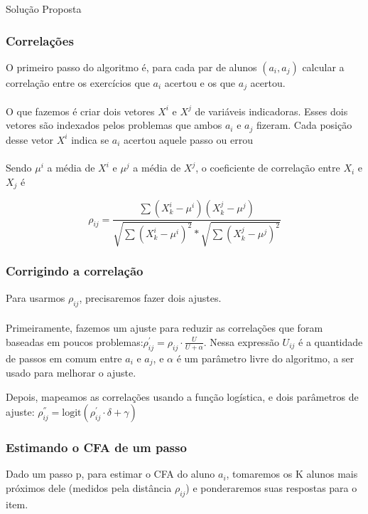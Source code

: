 \documentclass{article}
\begin{document}
\begin{section}{Solução Proposta}
   \subsubsection{Correlações}
   O primeiro passo do algoritmo é, para cada par de alunos $(a_i,a_j)$ calcular a correlação entre os exercícios que $a_i$ acertou e os que $a_j$ acertou.\\~\\

   O que fazemos é criar dois vetores $X^i$ e $X^j$ de variáveis indicadoras. Esses dois vetores são indexados pelos problemas que ambos $a_i$ e $a_j$ fizeram. Cada posição desse vetor $X^i$ indica se $a_i$ acertou aquele passo ou errou \\~\\

   Sendo $\mu^i$ a média de $X^i$ e $\mu^j$ a média de $X^j$, o coeficiente de correlação entre $X_i$ e $X_j$ é

   \[ \rho_{ij} = \frac{\sum(X^i_k - \mu^i)(X^j_k - \mu^j)}{\sqrt{\sum(X^i_k - \mu^i)^2}*\sqrt{\sum(X^j_k - \mu^j)^2}}  \]


   \subsubsection{Corrigindo a correlação}

   Para usarmos $\rho_{ij}$, precisaremos fazer dois ajustes.\\~\\

   Primeiramente, fazemos um ajuste para reduzir as correlações que foram baseadas em poucos problemas:$\rho^{'}_{ij}=\rho_{ij}\cdot\frac{U}{U+\alpha}$. Nessa expressão $U_{ij}$ é a quantidade de passos em comum entre $a_i$ e $a_j$, e $\alpha$ é um parâmetro livre do algoritmo, a ser usado para melhorar o ajuste.

   Depois, mapeamos as correlações usando a função logística, e dois parâmetros de ajuste: $\rho^{''}_{ij}=\text{logit}(\rho^{'}_{ij}\cdot\delta + \gamma)$


   \subsubsection{Estimando o CFA de um passo}

      Dado um passo p, para estimar o CFA do aluno $a_i$, tomaremos os K alunos mais próximos dele (medidos pela distância $\rho_{ij}$) e ponderaremos suas respostas para o item.\\~\\


\end{section}
\end{document}
